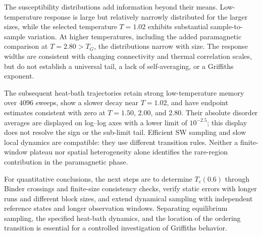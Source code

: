 \documentclass[a4paper,11pt]{article}
\begin{document}
The susceptibility distributions add information beyond their means. Low-temperature response is
large but relatively narrowly distributed for the larger sizes, while the selected temperature
$T=1.02$ exhibits substantial sample-to-sample variation. At higher temperatures, including the
added paramagnetic comparison at $T=2.80>T_G$, the distributions narrow with size.
The response widths are consistent with changing connectivity and thermal
correlation scales, but do not establish a universal tail, a lack of self-averaging, or a Griffiths
exponent.

The subsequent heat-bath trajectories retain strong low-temperature memory over $4096$ sweeps,
show a slower decay near $T=1.02$, and have endpoint estimates consistent with zero at
$T=1.50$, $2.00$, and $2.80$. Their absolute disorder averages are displayed on log--log axes
with a lower limit of $10^{-2.5}$; this display does not resolve the sign or the sub-limit tail. Efficient SW
sampling and slow local dynamics are compatible: they use different transition rules. Neither a
finite-window plateau nor spatial heterogeneity alone identifies the rare-region contribution in
the paramagnetic phase.

For quantitative conclusions, the next steps are to determine $T_c(0.6)$ through Binder crossings
and finite-size consistency checks, verify static errors with longer runs and different block
sizes, and extend dynamical sampling with independent reference states and longer observation
windows. Separating equilibrium sampling, the specified heat-bath dynamics, and the location of
the ordering transition is essential for a controlled investigation of Griffiths behavior.
\end{document}
